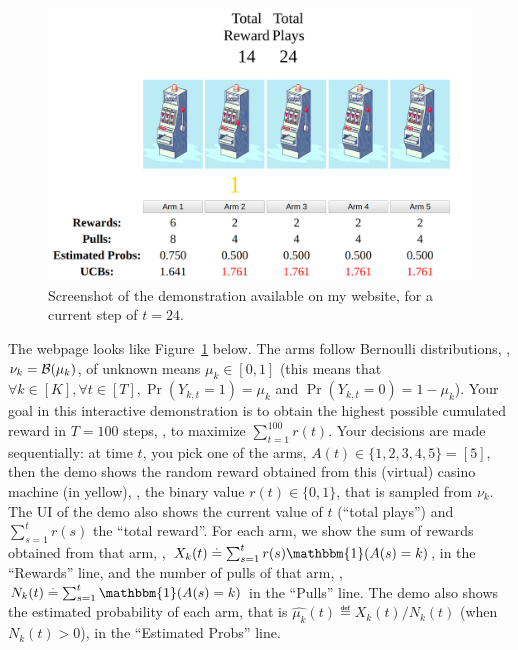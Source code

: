 
\begin{figure}[h!]  %
    \centering
    \includegraphics[width=0.85\linewidth]{2-Chapters/2-Chapter/Images/example_of_a_5_arm_bandit_problem.png}
    \caption[Screenshot of the demonstration for a current step of $t=24$.]{Screenshot of the demonstration available on my website, for a current step of $t=24$.}
    \label{fig:2:example_of_a_5_arm_bandit_problem}
\end{figure}


The webpage looks like Figure~\ref{fig:2:example_of_a_5_arm_bandit_problem} below.
The arms follow Bernoulli distributions, \ie, $\nu_k = \mathcal{B}(\mu_k)$, of unknown means $\mu_k\in[0,1]$ (this means that $\forall k\in[K], \forall t\in[T], \Pr(Y_{k,t} = 1) = \mu_k$ and $\Pr(Y_{k,t} = 0) = 1 - \mu_k$).
Your goal in this interactive demonstration is to obtain the highest possible cumulated reward in $T=100$ steps, \ie, to maximize $\sum_{t=1}^{100} r(t)$.
Your decisions are made sequentially: at time $t$, you pick one of the arms, $A(t) \in\{1,2,3,4,5\}=[5]$, then the demo shows the random reward obtained from this (virtual) casino machine (in \textcolor{deepgold}{yellow}), \ie, the binary value $r(t)\in\{0,1\}$, that is sampled \iid{} from $\nu_k$.
%
The UI of the demo also shows the current value of $t$ (``total plays'') and $\sum_{s=1}^t r(s)$ the ``total reward''.
For each arm, we show the sum of rewards obtained from that arm, \ie, $X_k(t) \eqdef \sum_{s=1}^t r(s) \mathbbm{1}(A(s) = k)$, in the ``Rewards'' line, and the number of pulls of that arm, \ie, $N_k(t) \eqdef \sum_{s=1}^t \mathbbm{1}(A(s) = k)$ in the ``Pulls'' line.
%
The demo also shows the estimated probability of each arm, that is $\widehat{\mu_k}(t) \eqdef X_k(t) / N_k(t)$ (when $N_k(t)>0$), in the ``Estimated Probs'' line.


